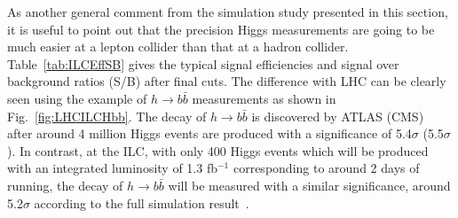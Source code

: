 
As another general comment from the simulation study presented in this section, 
it is useful to point out that the precision Higgs measurements 
are going to be much easier at a lepton collider than that at a hadron collider.
Table~\ref{tab:ILCEffSB} gives the typical signal efficiencies and signal over
background ratios (S/B) after final cuts. The difference with
LHC can be clearly seen using the example of $h\to b\bar{b}$ measurements
as shown in Fig.~\ref{fig:LHCILCHbb}. The decay of $h\to b\bar{b}$
is discovered by ATLAS (CMS)~\cite{} after around 4 million Higgs events are produced
with a significance of 5.4$\sigma$ (5.5$\sigma$). In contrast, at the ILC, 
with only 400 Higgs events which will be produced with an integrated luminosity of 1.3 fb$^{-1}$
corresponding to around 2 days of running, the decay of $h\to b\bar{b}$ will be 
measured with a similar significance, around 5.2$\sigma$ according to the full 
simulation result~\cite{}.

